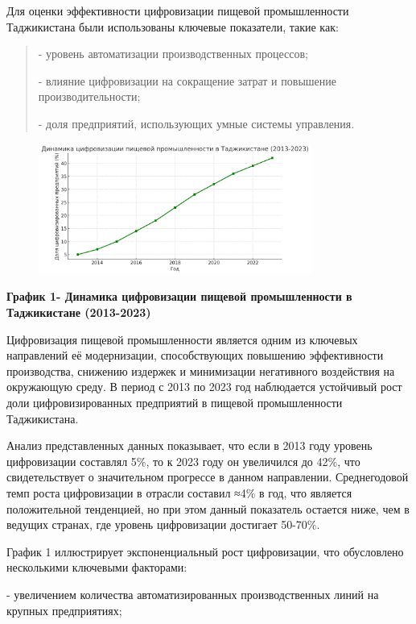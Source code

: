 Для оценки эффективности цифровизации пищевой промышленности
Таджикистана были использованы ключевые показатели, такие как:

\begin{quote}
- уровень автоматизации производственных процессов;

- влияние цифровизации на сокращение затрат и повышение
производительности;

- доля предприятий, использующих умные системы управления.
\end{quote}


\begin{figure}[H]
	\centering
	\includegraphics[width=0.8\textwidth]{media/ekon2/image48}
	\caption*{}
\end{figure}


{\bfseries График 1- Динамика цифровизации пищевой промышленности в
Таджикистане (2013-2023)}

Цифровизация пищевой промышленности является одним из ключевых
направлений её модернизации, способствующих повышению эффективности
производства, снижению издержек и минимизации негативного воздействия на
окружающую среду. В период с 2013 по 2023 год наблюдается устойчивый
рост доли цифровизированных предприятий в пищевой промышленности
Таджикистана.

Анализ представленных данных показывает, что если в 2013 году уровень
цифровизации составлял 5\%, то к 2023 году он увеличился до 42\%, что
свидетельствует о значительном прогрессе в данном направлении.
Среднегодовой темп роста цифровизации в отрасли составил ≈4\% в год, что
является положительной тенденцией, но при этом данный показатель
остается ниже, чем в ведущих странах, где уровень цифровизации достигает
50-70\%.

График 1 иллюстрирует экспоненциальный рост цифровизации, что
обусловлено несколькими ключевыми факторами:

- увеличением количества автоматизированных производственных линий на
крупных предприятиях;

